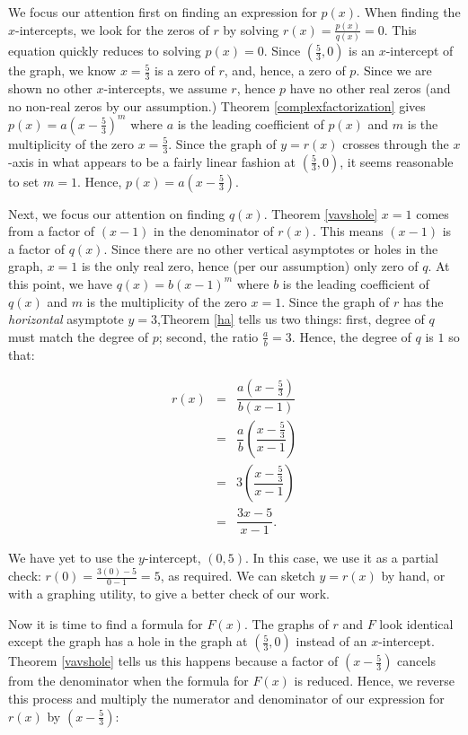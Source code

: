 \begin{ex}
We focus our attention first on finding an expression for $p(x)$.  When finding the $x$-intercepts, we look for the zeros of $r$ by solving $r(x) = \frac{p(x)}{q(x)} = 0$.  This equation quickly reduces to solving $p(x) =0$.  Since  $\left(\frac{5}{3}, 0 \right)$ is an $x$-intercept of the graph, we know $x = \frac{5}{3}$ is a zero of $r$, and, hence, a zero of $p$.  Since we are shown no other $x$-intercepts, we assume $r$, hence $p$ have no other real zeros (and no non-real zeros by our assumption.)  Theorem \ref{complexfactorization}  gives  $p(x) = a\left(x - \frac{5}{3}\right)^m$ where $a$ is the leading coefficient of $p(x)$ and $m$ is the multiplicity of the zero $x = \frac{5}{3}$.  Since the graph of $y = r(x)$ crosses through the $x$-axis in what appears to be a fairly linear fashion at  $\left(\frac{5}{3}, 0 \right)$, it seems reasonable to set $m=1$.  Hence, $p(x) = a \left(x - \frac{5}{3}\right)$.

Next, we focus our attention on finding $q(x)$.  Theorem \ref{vavshole} $x=1$ comes from a factor of $(x-1)$ in the denominator of $r(x)$.  This means $(x-1)$ is a factor of $q(x)$.  Since there are no other vertical asymptotes or holes in the graph, $x=1$ is the only real zero, hence (per our assumption) only zero of $q$.  At this point, we have $q(x) = b(x-1)^m$ where $b$ is the leading coefficient of $q(x)$ and $m$ is the multiplicity of the zero $x=1$.  Since the graph of  $r$ has the \textit{horizontal} asymptote $y = 3$,Theorem \ref{ha} tells us two  things:  first,  degree of $q$ must match the degree of $p$; second, the ratio $\frac{a}{b} = 3$.   Hence, the degree of $q$ is $1$ so that: 

\[ \begin{array}{rcl}

r(x) & = & \dfrac{a \left(x - \frac{5}{3}\right)}{b(x-1)} \\
       & = & \dfrac{a}{b} \left(\dfrac{x - \frac{5}{3}}{x-1}\right) \\
        & = & 3  \left(\dfrac{x - \frac{5}{3}}{x-1}\right) \\
        & = & \dfrac{3x-5}{x-1}. \end{array} \]

We have yet to use the $y$-intercept, $(0,5)$.  In this case, we use it as a partial check:  $r(0) = \frac{3(0)-5}{0-1} = 5$, as required.  We can sketch $y=r(x)$ by hand, or with a graphing utility, to give a better check of our work.

Now it is time to find a formula for $F(x)$.  The graphs of $r$ and $F$ look identical except the graph has a hole in the graph at $\left(\frac{5}{3}, 0 \right)$ instead of an $x$-intercept.  Theorem \ref{vavshole} tells us this happens because a factor of $\left(x - \frac{5}{3} \right)$ cancels from the denominator when the formula for $F(x)$ is reduced.  Hence, we reverse this process and multiply the numerator and denominator of our expression for $r(x)$ by $\left(x - \frac{5}{3} \right)$:


\end{ex}
